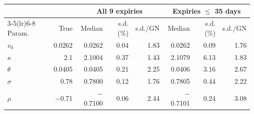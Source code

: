 \begin{tabular}{lrrrrrrr}
\toprule
 & & \multicolumn{3}{c}{All 9 expiries} & \multicolumn{3}{c}{Expiries $\le$ 35 days} \\
\cmidrule(lr){3-5}\cmidrule(lr){6-8}
Param. & True & Median & s.d. (\%) & s.d./GN & Median & s.d. (\%) & s.d./GN \\
\midrule
$v_0$ & 0.0262 & 0.0262 & 0.04 & 1.83 & 0.0262 & 0.09 & 1.76 \\
$\kappa$ & 2.1 & 2.1004 & 0.37 & 1.43 & 2.1079 & 6.13 & 1.83 \\
$\theta$ & 0.0405 & 0.0405 & 0.21 & 2.25 & 0.0406 & 3.16 & 2.67 \\
$\sigma$ & 0.78 & 0.7800 & 0.12 & 1.76 & 0.7805 & 0.44 & 2.22 \\
$\rho$ & \ensuremath{-}0.71 & \ensuremath{-}0.7100 & 0.06 & 2.44 & \ensuremath{-}0.7101 & 0.24 & 3.08 \\
\bottomrule
\end{tabular}
